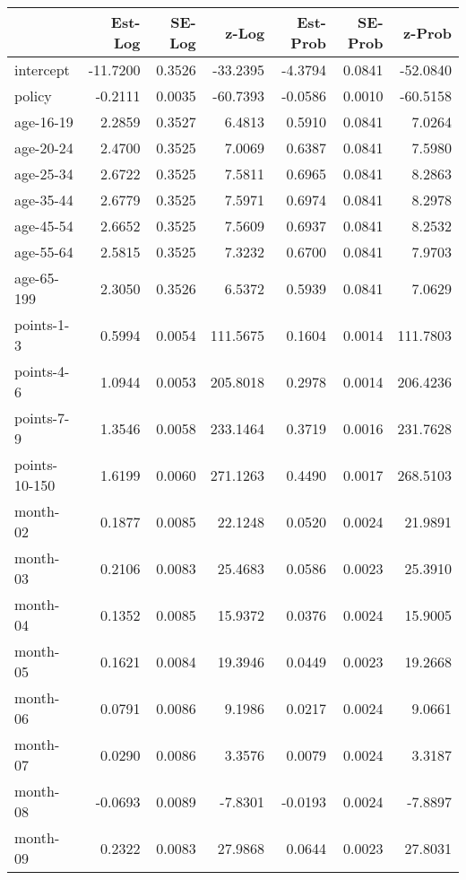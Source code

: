 \documentclass[10pt]{article}
\begin{document}
\begin{table}[ht]
\centering
\begin{tabular}{lrrrrrr}
  \hline
 & Est-Log & SE-Log & z-Log & Est-Prob & SE-Prob & z-Prob \\ 
  \hline
intercept & -11.7200 & 0.3526 & -33.2395 & -4.3794 & 0.0841 & -52.0840 \\ 
  policy & -0.2111 & 0.0035 & -60.7393 & -0.0586 & 0.0010 & -60.5158 \\ 
  age-16-19 & 2.2859 & 0.3527 & 6.4813 & 0.5910 & 0.0841 & 7.0264 \\ 
  age-20-24 & 2.4700 & 0.3525 & 7.0069 & 0.6387 & 0.0841 & 7.5980 \\ 
  age-25-34 & 2.6722 & 0.3525 & 7.5811 & 0.6965 & 0.0841 & 8.2863 \\ 
  age-35-44 & 2.6779 & 0.3525 & 7.5971 & 0.6974 & 0.0841 & 8.2978 \\ 
  age-45-54 & 2.6652 & 0.3525 & 7.5609 & 0.6937 & 0.0841 & 8.2532 \\ 
  age-55-64 & 2.5815 & 0.3525 & 7.3232 & 0.6700 & 0.0841 & 7.9703 \\ 
  age-65-199 & 2.3050 & 0.3526 & 6.5372 & 0.5939 & 0.0841 & 7.0629 \\ 
  points-1-3 & 0.5994 & 0.0054 & 111.5675 & 0.1604 & 0.0014 & 111.7803 \\ 
  points-4-6 & 1.0944 & 0.0053 & 205.8018 & 0.2978 & 0.0014 & 206.4236 \\ 
  points-7-9 & 1.3546 & 0.0058 & 233.1464 & 0.3719 & 0.0016 & 231.7628 \\ 
  points-10-150 & 1.6199 & 0.0060 & 271.1263 & 0.4490 & 0.0017 & 268.5103 \\ 
  month-02 & 0.1877 & 0.0085 & 22.1248 & 0.0520 & 0.0024 & 21.9891 \\ 
  month-03 & 0.2106 & 0.0083 & 25.4683 & 0.0586 & 0.0023 & 25.3910 \\ 
  month-04 & 0.1352 & 0.0085 & 15.9372 & 0.0376 & 0.0024 & 15.9005 \\ 
  month-05 & 0.1621 & 0.0084 & 19.3946 & 0.0449 & 0.0023 & 19.2668 \\ 
  month-06 & 0.0791 & 0.0086 & 9.1986 & 0.0217 & 0.0024 & 9.0661 \\ 
  month-07 & 0.0290 & 0.0086 & 3.3576 & 0.0079 & 0.0024 & 3.3187 \\ 
  month-08 & -0.0693 & 0.0089 & -7.8301 & -0.0193 & 0.0024 & -7.8897 \\ 
  month-09 & 0.2322 & 0.0083 & 27.9868 & 0.0644 & 0.0023 & 27.8031 \\ 

\end{tabular}
\end{table}
\end{document}
